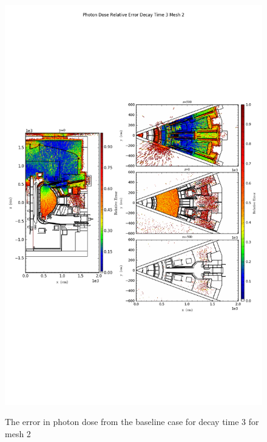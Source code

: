 \begin{figure}[ht!]
\centering
\includegraphics[trim={0cm 9cm 0cm 10cm},clip,scale=0.75]{../plots/final_model_nob4c/Photon_Dose_Relative_Error_Decay_Time_3_Mesh_2.png}
\label{fig:photons_dc3_no4bc_m2_error}
\caption{The error in photon dose from the baseline case for decay time 3 for mesh 2}
\end{figure}
